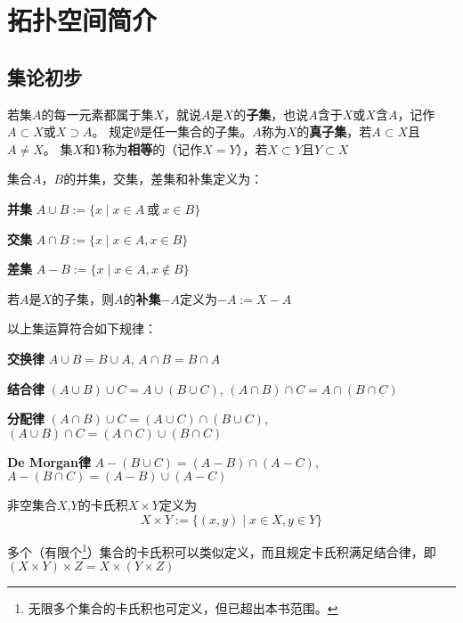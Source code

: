\chapter{拓扑空间简介}
\section{集论初步}

\begin{definition}
若集$A$的每一元素都属于集$X$，就说$A$是$X$的\textbf{子集}，也说$A$含于$X$或$X$含$A$，记作$A \subset X$或$X \supset A$。
规定$\emptyset$是任一集合的子集。$A$称为$X$的\textbf{真子集}，若$A \subset X$且$A \neq X$。
集$X$和$Y$称为\textbf{相等}的（记作$X = Y$），若$X \subset Y$且$Y \subset X$
\end{definition}

\begin{definition}
集合$A$，$B$的并集，交集，差集和补集定义为：

\textbf{并集} $A \cup B := \{x \mid x \in A ~ \text{或} ~ x \in B\}$

\textbf{交集} $A \cap B := \{x \mid x \in A, x \in B\}$

\textbf{差集} $A - B := \{x \mid x \in A, x \notin B\}$

若$A$是$X$的子集，则$A$的\textbf{补集}$-A$定义为$-A := X - A$

\end{definition}

\begin{theorem}
以上集运算符合如下规律：

\textbf{交换律} $A \cup B = B \cup A$, $A \cap B = B \cap A$

\textbf{结合律} $(A \cup B) \cup C = A \cup (B \cup C)$, $(A \cap B) \cap C = A \cap (B \cap C)$

\textbf{分配律} $(A \cap B) \cup C = (A \cup C) \cap (B \cup C)$, $(A \cup B) \cap C = (A \cap C) \cup (B \cap C)$

\textbf{De Morgan律} $A - (B \cup C) = (A - B) \cap (A - C)$, $A - (B \cap C) = (A - B) \cup (A - C)$

\end{theorem}

\begin{definition}
非空集合$X$,$Y$的卡氏积$X \times Y$定义为
$$X \times Y := \{(x, y) \mid x \in X, y \in Y\}$$
\end{definition}
多个（有限个\footnote{无限多个集合的卡氏积也可定义，但已超出本书范围。}）集合的卡氏积可以类似定义，而且规定卡氏积满足结合律，即$(X \times Y) \times Z = X \times (Y \times Z)$

